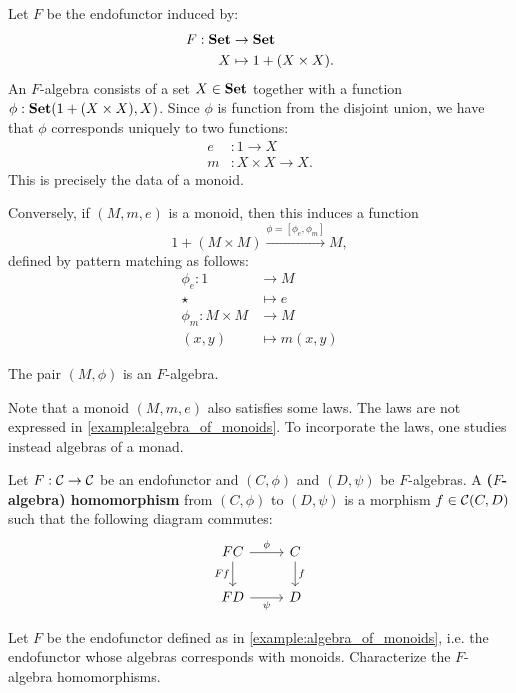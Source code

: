 \begin{exa}\label{example:algebra_of_monoids} Let $F$ be the endofunctor induced by:
\begin{align*}
  F: \mathbf{Set} &\to \mathbf{Set}
  \\
  X &\mapsto 1 + (X\times X).
\end{align*}
An $F$-algebra consists of a set $X\in\mathbf{Set}$ together with a function $\phi:{\mathbf{Set}}(1 + (X\times X),X)$. Since $\phi$ is function from the disjoint union, we have that $\phi$ corresponds uniquely to two functions:
\begin{align*}
e &: 1\to X
\\
m &: X\times X\to X.
\end{align*}
This is precisely the data of a monoid.

Conversely, if $(M,m,e)$ is a monoid, then this induces a function
\[
1 + (M\times M) \xrightarrow{\phi = [\phi_e,\phi_m]} M,
\]
defined by pattern matching as follows:
\begin{align*}
\phi_e : 1 &\to M
\\
\star &\mapsto e
\\
\phi_m : M\times M &\to M 
\\
(x,y) &\mapsto m(x,y)
\end{align*}

The pair $(M, \phi)$ is an $F$-algebra.

\end{exa}

\begin{rem}
 Note that a monoid $(M,m,e)$ also satisfies some laws.
 The laws are not expressed in \cref{example:algebra_of_monoids}.
 To incorporate the laws, one studies instead algebras of a monad.
\end{rem}


\begin{dfn}\label{dfn:alg-hom}
Let $F:\mathcal{C}\to \mathcal{C}$ be an endofunctor and $(C,\phi)$ and $(D,\psi)$ be $F$-algebras. 
A \textbf{($F$-algebra) homomorphism} from $(C,\phi)$ to $(D,\psi)$ is a morphism $f\in {\mathcal{C}}(C,D)$ such that the following diagram commutes:
\[
\begin{tikzcd}
FC
\arrow[r, "\phi"] 
\arrow[d,swap, "Ff"]
& C 
\arrow[d, "f"] 
\\
FD
\arrow[r, swap, "\psi"] 
& D
\end{tikzcd}
\]
\end{dfn}



\begin{exer} 
Let $F$ be the endofunctor defined as in \cref{example:algebra_of_monoids}, 
i.e. the endofunctor whose algebras corresponds with monoids. 
Characterize the $F$-algebra homomorphisms.
\end{exer}

